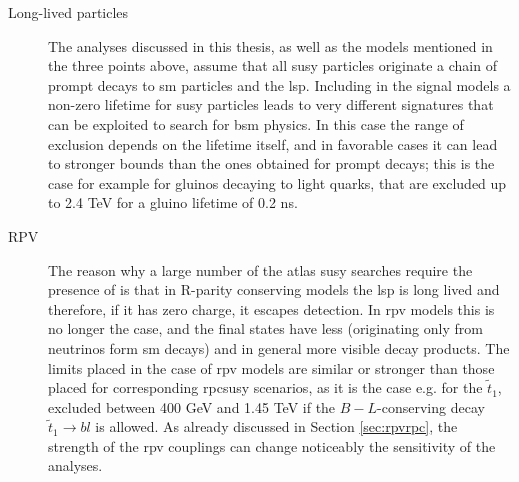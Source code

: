 \begin{description}
\item[Long-lived particles] The analyses discussed in this thesis, as well as the models mentioned in the three points above, assume that 
all \gls{susy} particles originate a chain of prompt decays to \gls{sm} particles and the \gls{lsp}.
Including in the signal models a non-zero lifetime for \gls{susy} particles leads to very different signatures that can be exploited to 
search for \gls{bsm} physics. In this case the range of exclusion depends on the lifetime itself, and in 
favorable cases it can lead to stronger bounds than the ones obtained for prompt decays;
this is the case for example for gluinos decaying to light quarks, that are excluded up to 2.4 TeV for a gluino lifetime of 0.2 ns.  

\item[RPV] The reason why a large number of the \gls{atlas} \gls{susy} searches require the presence of \met is that in R-parity conserving models 
the \gls{lsp} is long lived and therefore, if it has zero charge, it escapes detection. In \gls{rpv} models this is no longer the case,
and the final states have less \met (originating only from neutrinos form \gls{sm} decays) and in general more visible decay products. 
The limits placed in the case of \gls{rpv} models are similar or stronger than those placed for corresponding \gls{rpcsusy} scenarios, as it is 
the case e.g. for the $\tilde{t}_1$, excluded between 400 GeV and 1.45 TeV if the $B-L$-conserving decay $\tilde{t}_1 \to b l$ is allowed. 
As already discussed in Section \ref{sec:rpvrpc}, the strength of the \gls{rpv} couplings can change noticeably the sensitivity of the 
analyses. 

\end{description}

